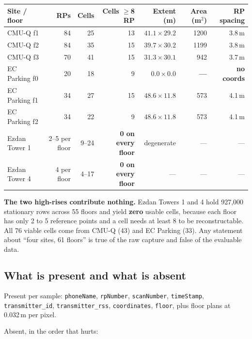 \documentclass[10pt,a4paper]{article}
\newcommand{\B}[1]{\textcolor{bad}{\textbf{#1}}}
\begin{document}
\begin{center}\small
\begin{tabular}{@{}lrrrrrr@{}}
\toprule
Site / floor & RPs & Cells & Cells $\ge$8 RP & Extent (m) & Area (m$^2$) & RP spacing \\ \midrule
CMU-Q f1 & 84 & 25 & 13 & $41.1\times29.2$ & 1200 & 3.8\,m \\
\rowcolor{green!8}CMU-Q f2 & 84 & 35 & 15 & $39.7\times30.2$ & 1199 & 3.8\,m \\
CMU-Q f3 & 70 & 41 & 15 & $31.3\times30.1$ & 942 & 3.7\,m \\
EC Parking f0 & 20 & 18 & 9 & \B{$0.0\times0.0$} & \B{---} & \B{no coords} \\
EC Parking f1 & 34 & 27 & 15 & $48.6\times11.8$ & 573 & 4.1\,m \\
EC Parking f2 & 34 & 22 & 9 & $48.6\times11.8$ & 573 & 4.1\,m \\
\midrule
Ezdan Tower 1 & 2--5 per floor & 9--24 & \B{0 on every floor} & degenerate & --- & --- \\
Ezdan Tower 4 & 4 per floor & 4--17 & \B{0 on every floor} & --- & --- & --- \\
\bottomrule
\end{tabular}
\end{center}

\textbf{The two high-rises contribute nothing.} Ezdan Towers 1 and 4 hold 927{,}000
stationary rows across 55 floors and yield \B{zero} usable cells, because each floor has
only 2 to 5 reference points and a cell needs at least 8 to be reconstructable. All 76
viable cells come from CMU-Q (43) and EC Parking (33). Any statement about ``four sites,
61 floors'' is true of the raw capture and false of the evaluable data.

\subsection{What is present and what is absent}

Present per sample: \texttt{phoneName}, \texttt{rpNumber}, \texttt{scanNumber},
\texttt{timeStamp}, \texttt{transmitter\_id}, \texttt{transmitter\_rss},
\texttt{coordinates}, \texttt{floor}, plus floor plans at 0.032\,m per pixel.

Absent, in the order that hurts:
\end{document}
